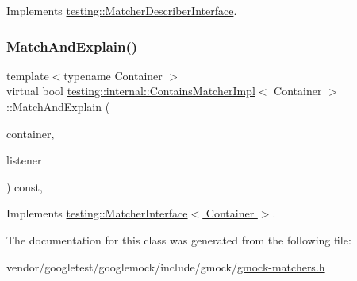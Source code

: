 Implements \hyperlink{classtesting_1_1_matcher_describer_interface_ad9f861588bd969b6e3e717f13bb94e7b}{testing\+::\+Matcher\+Describer\+Interface}.

\mbox{\label{classtesting_1_1internal_1_1_contains_matcher_impl_a1cb9f1d2da48bd4a48c281215f8f94e9}} 
\subsubsection{\texorpdfstring{Match\+And\+Explain()}{MatchAndExplain()}}
{\footnotesize\ttfamily template$<$typename Container $>$ \\
virtual bool \hyperlink{classtesting_1_1internal_1_1_contains_matcher_impl}{testing\+::internal\+::\+Contains\+Matcher\+Impl}$<$ Container $>$\+::Match\+And\+Explain (\begin{DoxyParamCaption}\item[{Container}]{container,  }\item[{\hyperlink{classtesting_1_1_match_result_listener}{Match\+Result\+Listener} $\ast$}]{listener }\end{DoxyParamCaption}) const\hspace{0.3cm}{\ttfamily [inline]}, {\ttfamily [virtual]}}



Implements \hyperlink{classtesting_1_1_matcher_interface_a296b43607cd99d60365f0e6a762777cf}{testing\+::\+Matcher\+Interface$<$ Container $>$}.



The documentation for this class was generated from the following file\+:\begin{DoxyCompactItemize}
\item 
vendor/googletest/googlemock/include/gmock/\hyperlink{gmock-matchers_8h}{gmock-\/matchers.\+h}\end{DoxyCompactItemize}

